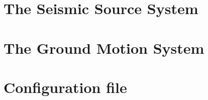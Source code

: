 \section{The Seismic Source System}

\label{sec:seismic_source_system}

\section{The Ground Motion System}
\label{sec:ground_motion_system}


\section{Configuration file}
\label{sec:configuration_file}
